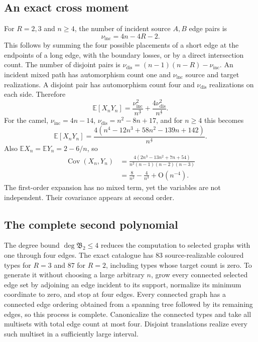 \documentclass[11pt]{article}
\numberwithin{equation}{section}
\theoremstyle{definition}
\theoremstyle{remark}
\theoremstyle{definition}
\newcommand{\E}{\mathbb E}
\newcommand{\fall}[2]{{#1}^{\underline{#2}}}
\newcommand{\bigO}{\mathrm O}
\begin{document}
\subsection{An exact cross moment}
For $R=2,3$ and $n\ge4$, the number of incident source $A,B$ edge pairs is
\begin{equation}
 \nu_{\mathrm{inc}}=4n-4R-2.
 \label{spf:cg:eq:incidence}
\end{equation}
This follows by summing the four possible placements of a short edge at
the endpoints of a long edge, with the boundary losses, or by a direct
intersection count. The number of disjoint pairs is
$\nu_{\mathrm{dis}}=(n-1)(n-R)-\nu_{\mathrm{inc}}$. An incident mixed path
has automorphism count one and $\nu_{\mathrm{inc}}$ source and target
realizations. A disjoint pair has automorphism count four and
$\nu_{\mathrm{dis}}$ realizations on each side. Therefore
\begin{equation}
 \E[X_nY_n]=\frac{\nu_{\mathrm{inc}}^2}{\fall n3}+\frac{4\nu_{\mathrm{dis}}^2}{\fall n4}.
 \label{spf:cg:eq:EXY}
\end{equation}
For the camel, $\nu_{\mathrm{inc}}=4n-14$, $\nu_{\mathrm{dis}}=n^2-8n+17$,
and for $n\ge4$ this becomes
\begin{equation}
 \E[X_nY_n]=
 \frac{4(n^4-12n^3+58n^2-139n+142)}{\fall n4}.
 \label{spf:cg:eq:EXYcamel}
\end{equation}
Also $\E X_n=\E Y_n=2-6/n$, so
\begin{equation}
 \begin{split}
 \operatorname{Cov}(X_n,Y_n)
 &=\frac{4(2n^3-13n^2+7n+54)}{n^2(n-1)(n-2)(n-3)}\\
 &=\frac8{n^2}-\frac4{n^3}+\bigO(n^{-4}).
 \end{split}
 \label{spf:cg:eq:covariance}
\end{equation}
The first-order expansion has no mixed term, yet the variables are not
independent. Their covariance appears at second order.

\subsection{The complete second polynomial}
The degree bound $\deg\mathfrak B_2\le4$ reduces the computation to selected
graphs with one through four edges. The exact catalogue has $83$
source-realizable coloured types for $R=3$ and $87$ for $R=2$, including types
whose target count is zero. To generate it without choosing a large arbitrary
$n$, grow every connected selected edge set by adjoining an edge incident to
its support, normalize its minimum coordinate to zero, and stop at four edges.
Every connected graph has a connected edge ordering obtained from a spanning
tree followed by its remaining edges, so this process is complete.
Canonicalize the connected types and take all multisets with total edge
count at most four. Disjoint translations realize every such multiset in
a sufficiently large interval.
\end{document}
